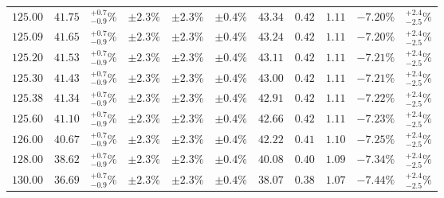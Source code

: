 \begin{table}[ht!]
{{\begin{tabular}{| cc | c | ccc | cccc | c |}
$125.00$ & $41.75$ & $^{+0.7}_{-0.9}\%$ & $\pm 2.3\%$ & {\color{black!55}$\pm 2.3\%$} & {\color{black!55}$\pm 0.4\%$} & $43.34$ & $0.42$ & $1.11$ & $-7.20\%$ & $^{+2.4}_{-2.5}\%$ \\
$125.09$ & $41.65$ & $^{+0.7}_{-0.9}\%$ & $\pm 2.3\%$ & {\color{black!55}$\pm 2.3\%$} & {\color{black!55}$\pm 0.4\%$} & $43.24$ & $0.42$ & $1.11$ & $-7.20\%$ & $^{+2.4}_{-2.5}\%$ \\
$125.20$ & $41.53$ & $^{+0.7}_{-0.9}\%$ & $\pm 2.3\%$ & {\color{black!55}$\pm 2.3\%$} & {\color{black!55}$\pm 0.4\%$} & $43.11$ & $0.42$ & $1.11$ & $-7.21\%$ & $^{+2.4}_{-2.5}\%$ \\
$125.30$ & $41.43$ & $^{+0.7}_{-0.9}\%$ & $\pm 2.3\%$ & {\color{black!55}$\pm 2.3\%$} & {\color{black!55}$\pm 0.4\%$} & $43.00$ & $0.42$ & $1.11$ & $-7.21\%$ & $^{+2.4}_{-2.5}\%$ \\
$125.38$ & $41.34$ & $^{+0.7}_{-0.9}\%$ & $\pm 2.3\%$ & {\color{black!55}$\pm 2.3\%$} & {\color{black!55}$\pm 0.4\%$} & $42.91$ & $0.42$ & $1.11$ & $-7.22\%$ & $^{+2.4}_{-2.5}\%$ \\
$125.60$ & $41.10$ & $^{+0.7}_{-0.9}\%$ & $\pm 2.3\%$ & {\color{black!55}$\pm 2.3\%$} & {\color{black!55}$\pm 0.4\%$} & $42.66$ & $0.42$ & $1.11$ & $-7.23\%$ & $^{+2.4}_{-2.5}\%$ \\
$126.00$ & $40.67$ & $^{+0.7}_{-0.9}\%$ & $\pm 2.3\%$ & {\color{black!55}$\pm 2.3\%$} & {\color{black!55}$\pm 0.4\%$} & $42.22$ & $0.41$ & $1.10$ & $-7.25\%$ & $^{+2.4}_{-2.5}\%$ \\
$128.00$ & $38.62$ & $^{+0.7}_{-0.9}\%$ & $\pm 2.3\%$ & {\color{black!55}$\pm 2.3\%$} & {\color{black!55}$\pm 0.4\%$} & $40.08$ & $0.40$ & $1.09$ & $-7.34\%$ & $^{+2.4}_{-2.5}\%$ \\
$130.00$ & $36.69$ & $^{+0.7}_{-0.9}\%$ & $\pm 2.3\%$ & {\color{black!55}$\pm 2.3\%$} & {\color{black!55}$\pm 0.4\%$} & $38.07$ & $0.38$ & $1.07$ & $-7.44\%$ & $^{+2.4}_{-2.5}\%$ \\
\cline{1-11}
\end{tabular}
}
}
\end{table}

